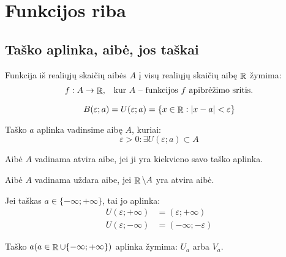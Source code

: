 \chapter{Funkcijos riba}

\section{Taško aplinka, aibė, jos taškai}

\begin{notation}
  Funkcija iš realiųjų skaičių aibės $A$ į visų realiųjų skaičių aibę 
  $\mathop{\mathbb{R}}$ žymima:
  \[
  \begin{array}[]{c l}
    f : A \to \RSET, & \text{kur $A$ – funkcijos $f$ apibrėžimo sritis.}
  \end{array}
  \]
\end{notation}

\begin{defn}
  \[
  B(\varepsilon; a) = U(\varepsilon; a) =%
  \{ x \in \RSET : |x - a| < \varepsilon \}
  \]
\end{defn}

\begin{defn}
  Taško $a$ aplinka vadinsime aibę $A$, kuriai:
  \[
  \varepsilon > 0 : \exists U(\varepsilon; a) \subset A
  \]
\end{defn}

\begin{defn}
  Aibė $A$ vadinama atvira aibe, jei ji yra kiekvieno savo taško aplinka.
\end{defn}

\begin{defn}
  Aibė $A$ vadinama uždara aibe, jei $\mathop{\mathbb{R}} \setminus A$ yra atvira aibė.
\end{defn}

\begin{note}
  Jei taškas $a \in \{-\infty; +\infty\}$, tai jo aplinka:
  \begin{align*}
    U(\varepsilon; +\infty) &= (\varepsilon; +\infty) \\
    U(\varepsilon; -\infty) &= (-\infty; -\varepsilon)
  \end{align*}
\end{note}

\begin{notation}
  Taško $a (a \in \mathop{\mathbb{R}} \cup \{-\infty;+\infty\})$ aplinka žymima:
  $U_{a}$ arba $V_{a}$.
\end{notation}

